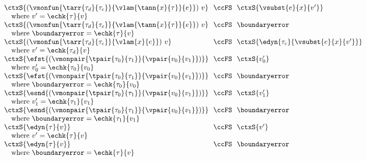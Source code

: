 \begin{flushleft}
\begin{minipage}[t]{\columnwidth}
$\begin{array}{l@{~~}c@{~~}l}
  \ctxS{(\vmonfun{\tarr{\tau_d}{\tau_c}}{\vlam{\tann{x}{\tau}}{e}})~v} & \ccFS & \ctxS{\vsubst{e}{x}{v'}}
\\ \multicolumn{3}{l}{\mbox{\quad where $v' = \echk{\tau}{v}$}}
\\
  \ctxS{(\vmonfun{\tarr{\tau_d}{\tau_c}}{\vlam{\tann{x}{\tau}}{e}})~v} & \ccFS & \boundaryerror
\\ \multicolumn{3}{l}{\mbox{\quad where $\boundaryerror = \echk{\tau}{v}$}}
\\
  \ctxS{(\vmonfun{\tarr{\tau_d}{\tau_c}}{\vlam{x}{e}})~v} & \ccFS & \ctxS{\edyn{\tau_c}{\vsubst{e}{x}{v'}}}
\\ \multicolumn{3}{l}{\mbox{\quad where $v' = \echk{\tau_d}{v}$}}
\\
  \ctxS{\efst{(\vmonpair{\tpair{\tau_0}{\tau_1}}{\vpair{v_0}{v_1}})}} & \ccFS & \ctxS{v_0'}
\\ \multicolumn{3}{l}{\mbox{\quad where $v_0' = \echk{\tau_0}{v_0}$}}
\\
  \ctxS{\efst{(\vmonpair{\tpair{\tau_0}{\tau_1}}{\vpair{v_0}{v_1}})}} & \ccFS & \boundaryerror
\\ \multicolumn{3}{l}{\mbox{\quad where $\boundaryerror = \echk{\tau_0}{v_0}$}}
\\
  \ctxS{\esnd{(\vmonpair{\tpair{\tau_0}{\tau_1}}{\vpair{v_0}{v_1}})}} & \ccFS & \ctxS{v_1'}
\\ \multicolumn{3}{l}{\mbox{\quad where $v_1' = \echk{\tau_1}{v_1}$}}
\\
  \ctxS{\esnd{(\vmonpair{\tpair{\tau_0}{\tau_1}}{\vpair{v_0}{v_1}})}} & \ccFS & \boundaryerror
\\ \multicolumn{3}{l}{\mbox{\quad where $\boundaryerror = \echk{\tau_1}{v_1}$}}
\\
  \ctxS{\edyn{\tau}{v}} & \ccFS & \ctxS{v'}
\\ \multicolumn{3}{l}{\mbox{\quad where $v' = \echk{\tau}{v}$}}
\\
  \ctxS{\edyn{\tau}{v}} & \ccFS & \boundaryerror
\\ \multicolumn{3}{l}{\mbox{\quad where $\boundaryerror = \echk{\tau}{v}$}}
\end{array}$
\end{minipage}


\end{flushleft}
